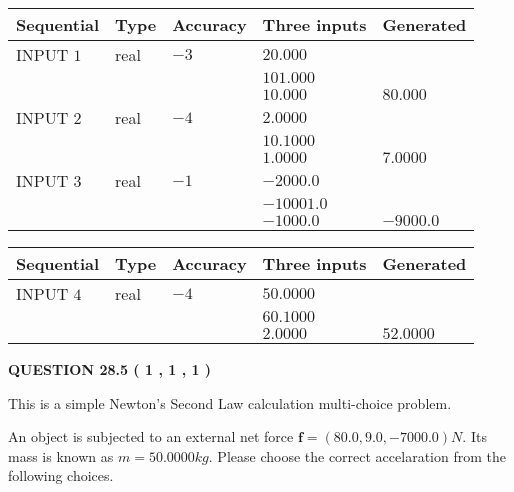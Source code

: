 \documentclass[12pt]{article}
\begin{document}
  
\noindent\begin{tabular}{|l|l|l|l|l|}
\hline
 Sequential & Type & Accuracy & Three inputs & Generated \\ 
\hline
 
 
  INPUT $            1 $ & real & $           -3  $ & $
 20.000
  $ & \\
  & & &  $
 101.000
  $ & \\
  & & &  $
 10.000
 $ & $ 80.000 $ 
 \\  \hline  
 
 
  INPUT $            2 $ & real & $           -4  $ & $
 2.0000
  $ & \\
  & & &  $
 10.1000
  $ & \\
  & & &  $
 1.0000
 $ & $ 7.0000 $ 
 \\  \hline  
 
 
  INPUT $            3 $ & real & $           -1  $ & $
 -2000.0
  $ & \\
  & & &  $
 -10001.0
  $ & \\
  & & &  $
 -1000.0
 $ & $ -9000.0 $ 
 \\  \hline  
 \end{tabular}
   
   
  
  
\noindent\begin{tabular}{|l|l|l|l|l|}
\hline
 Sequential & Type & Accuracy & Three inputs & Generated \\ 
\hline
 
 
  INPUT $            4 $ & real & $           -4  $ & $
 50.0000
  $ & \\
  & & &  $
 60.1000
  $ & \\
  & & &  $
 2.0000
 $ & $ 52.0000 $ 
 \\  \hline  
 \end{tabular}
   
   
  
\vspace{0.2in}
  
{\textbf{\Large{QUESTION
28.5 
 (           1 ,           1 ,           1 )
}}}
  
  


\noindent{}
This is a simple Newton's Second Law calculation multi-choice problem.  
\noindent{}


 
 
An object is subjected to an external net force $\mathbf{f}=
(80.0 , 9.0 , -7000.0) N$.
Its mass is known as $m= %
50.0000 kg$. Please choose the
correct accelaration from the following choices.
 
\end{document}
